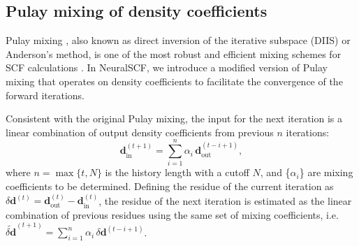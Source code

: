 \documentclass[%
reprint,
superscriptaddress,
bibnotes,
amsmath,amssymb,
aps,
floatfix, %
]{revtex4-2}
\begin{document}
\subsection{\label{sec:pulay}Pulay mixing of density coefficients}
\noindent Pulay mixing \cite{pulay1980convergence}, also known as direct inversion of the iterative subspace (DIIS) or Anderson's method, is one of the most robust and efficient mixing schemes for SCF calculations \cite{woods2019}. In NeuralSCF, we introduce a modified version of Pulay mixing that operates on density coefficients to facilitate the convergence of the forward iterations.

Consistent with the original Pulay mixing, the input for the next iteration is a linear combination of output density coefficients from previous $n$ iterations:
\begin{equation}
  \mathbf{d}^{(t+1)}_\text{in} = \sum_{i=1}^{n} \alpha_i \, \mathbf{d}^{(t-i+1)}_\text{out},
\end{equation}
where $n = \max\{t, N\}$ is the history length with a cutoff $N$, and \{$\alpha_i$\} are mixing coefficients to be determined. Defining the residue of the current iteration as $\delta \mathbf{d}^{(t)} = \mathbf{d}^{(t)}_\text{out} - \mathbf{d}^{(t)}_\text{in}$, the residue of the next iteration is estimated as the linear combination of previous residues using the same set of mixing coefficients, i.e. $\widetilde{\delta \mathbf{d}}^{(t+1)} = \sum_{i=1}^n \alpha_i \, \delta \mathbf{d}^{(t-i+1)}$. 
\end{document}
